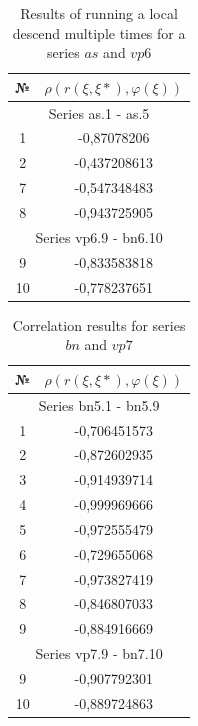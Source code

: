 \documentclass{ifacconf}
\begin{document}
\begin{table}[h!]
	\centering
	\begin{tabular}{|c|c|}
		\hline
		\hspace*{2mm} № \hspace*{2mm} & \hspace*{1cm} $\rho(r(\xi, \xi*),\varphi(\xi))$\hspace*{1cm}\\
		\hline
		\multicolumn{2}{|c|}{Series as.1 - as.5}\\
		\hline
		1  & -0,87078206\\
		2  & -0,437208613\\
		7  & -0,547348483\\
		8  & -0,943725905\\
		\hline
		\multicolumn{2}{|c|}{Series vp6.9 - bn6.10}\\
		\hline
		9  & -0,833583818\\
		10 & -0,778237651\\
		\hline	
	\end{tabular}
	\vspace{1em}
	\caption{Results of running a local descend multiple times for a series $as$ and $vp6$}	\label{res_korr_as_vp}
\end{table}

\begin{table}[h!]
	\centering
	\begin{tabular}{|c|c|}
		\hline
		\hspace*{2mm} № \hspace*{2mm} & \hspace*{1cm} $\rho(r(\xi, \xi*),\varphi(\xi))$\hspace*{1cm}\\
		\hline
		\multicolumn{2}{|c|}{Series bn5.1 - bn5.9}\\
		\hline
		1  & -0,706451573\\
		2  & -0,872602935\\
		3  & -0,914939714\\
		4  & -0,999969666\\
		5  & -0,972555479\\
		6  & -0,729655068\\
		7  & -0,973827419\\
		8  & -0,846807033\\
		9  & -0,884916669\\
		\hline
		\multicolumn{2}{|c|}{Series vp7.9 - bn7.10}\\
		\hline
		9  & -0,907792301\\
		10 & -0,889724863\\		
		\hline		
	\end{tabular}
	\vspace{1em}
	\caption{Correlation results for series $bn$ and $vp7$}	\label{res_korr_bn_vp}
\end{table}
\end{document}
